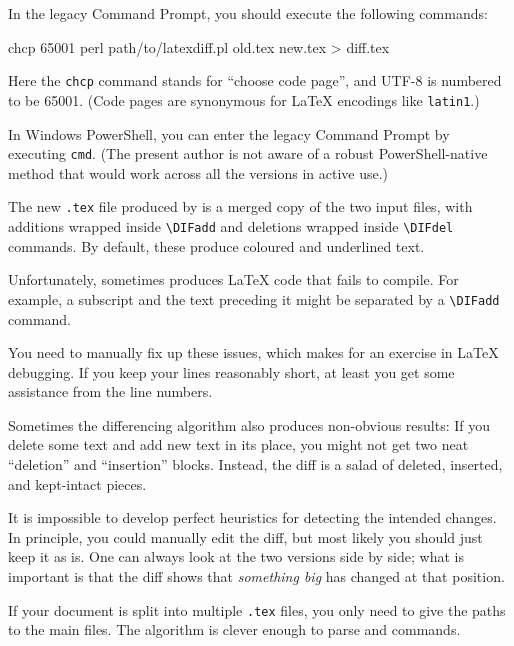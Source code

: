 In the legacy Command Prompt, you should execute the following commands:
\begin{ExampleCode}
chcp 65001
perl path/to/latexdiff.pl old.tex new.tex > diff.tex
\end{ExampleCode}
Here the \verb|chcp| command stands for ``choose code page'',
and UTF-8 is numbered to be 65001.
(Code pages are synonymous for \LaTeX{} encodings like \verb|latin1|.)

In Windows PowerShell, you can enter the legacy Command Prompt by executing \verb|cmd|.
(The present author is not aware of a robust PowerShell-native method that would work across
all the versions in active use.)

The new \verb|.tex| file produced by 
is a merged copy of the two input files,
with additions wrapped inside \verb|\DIFadd|
and deletions wrapped inside \verb|\DIFdel| commands.
By default, these produce coloured and underlined text.

\begin{gotcha}
Unfortunately,  sometimes produces \LaTeX{} code that fails to compile.
For example, a subscript and the text preceding it might be separated by a \verb|\DIFadd| command.

You need to manually fix up these issues,
which makes for an exercise in \LaTeX{} debugging.
If you keep your lines reasonably short,
at least you get some assistance from the line numbers.

\end{gotcha}

\begin{gotcha}
Sometimes the differencing algorithm also produces non-obvious results:
If you delete some text and add new text in its place,
you might not get two neat ``deletion'' and ``insertion'' blocks.
Instead, the diff is a salad of deleted, inserted, and kept-intact pieces.

It is impossible to develop perfect heuristics for detecting the intended changes.
In principle, you could manually edit the diff,
but most likely you should just keep it as is.
One can always look at the two versions side by side;
what is important is that the diff shows that \emph{something big} has changed at that position.
\end{gotcha}

If your document is split into multiple \verb|.tex| files,
you only need to give the paths to the main files.
The algorithm is clever enough to parse \verb|| and \verb|| commands.
